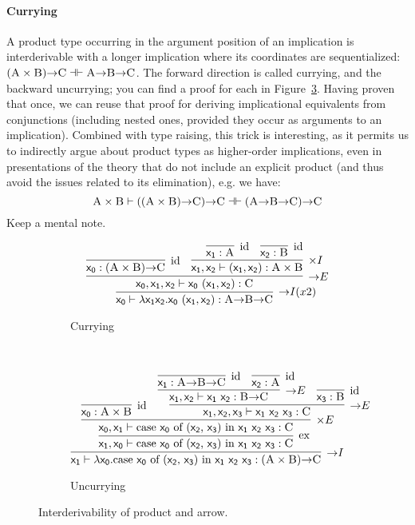 \paragraph{Currying}
A product type occurring in the argument position of an implication is interderivable with a longer implication where its coordinates are sequentialized: $(\smallprop{A}\times\smallprop{B}) \ii \smallprop{C} \dashv \vdash \smallprop{A} \ii \smallprop{B} \ii \smallprop{C}$.
The forward direction is called currying, and the backward uncurrying; you can find a proof for each in Figure~\ref{figure:curry_uncurry}.
Having proven that once, we can reuse that proof for deriving implicational equivalents from conjunctions (including nested ones, provided they occur as arguments to an implication).
Combined with type raising, this trick is interesting, as it permits us to indirectly argue about product types as higher-order implications, even in presentations of the theory that do not include an explicit product (and thus avoid the issues related to its elimination), e.g. we have:
\[
	\prop{A} \times \prop{B} \vdash ((\prop{A} \times \prop{B}) \ii \prop{C}) \ii \prop{C} \dashv \vdash (\prop{A} \ii \prop{B} \ii \prop{C}) \ii \prop{C}
\]
Keep a mental note.

\begin{figure}
	\centering
	\begin{subfigure}{1\textwidth}
		\[
		\infer[\ii I (x2)]{\term{x_0} \vdash \term{\lambda x_1x_2.x_0~(\term{x_1},\term{x_2})}: \prop{A} \ii \prop{B} \ii \prop{C}}{
			\infer[\ii E]{\term{x_0}, \term{x_1}, \term{x_2} \vdash \term{x_0}~(\term{x_1}, \term{x_2}): \prop{C}}{
				\infer[\Ax]{\term{x_0}: (\prop{A} \times \prop{B}) \ii \prop{C}}{}
				&
				\infer[\times I]{ \term{x_1}, \term{x_2} \vdash (\term{x_1},\term{x_2}): \prop{A} \times \prop{B}}{
					\infer[\Ax]{\term{x_1}: \prop{A}}{}
					&			
					\infer[\Ax]{\term{x_2}: \prop{B}}{}
				}
			}
		}
		\]
		\caption{Currying}
		\label{subfigure:currying}
	\end{subfigure}\\[\midsep]
	\begin{subfigure}{1\textwidth}
		\[
			\infer[\ii I]{\term{x_1} \vdash \term{\lambda x_0.}\cterm{case \term{x_0} of (\term{x_2}, \term{x_3}) in \term{x_1~x_2~x_3}}:(\prop{A} \times \prop{B})\ii \prop{C}}{
				\infer[\Exchange{}]{\term{x_1}, \term{x_0}  \vdash \cterm{case \term{x_0} of (\term{x_2}, \term{x_3}) in \term{x_1~x_2~x_3}}:\prop{C}}{
					\infer[\times E]{\term{x_0}, \term{x_1} \vdash \cterm{case \term{x_0} of (\term{x_2}, \term{x_3}) in \term{x_1~x_2~x_3}}:\prop{C}}{
						\infer[\Ax]{\term{x_0}: \prop{A} \times \prop{B}}{}
						&
						\infer[\ii E]{\term{x_1}, \term{x_2}, \term{x_3} \vdash \term{x_1~x_2~x_3}: \prop{C}}{
							\infer[\ii E]{\term{x_1}, \term{x_2} \vdash \term{x_1~x_2}: \prop{B} \ii \prop{C}}{
								\infer[\Ax]{\term{x_1}: \prop{A} \ii \prop{B} \ii \prop{C}}{}
								&
								\infer[\Ax]{\term{x_2}: \prop{A}}{}
							}
							&
							\infer[\Ax]{\term{x_3}: \prop{B}}{}
						}
					}
				}
			}
		\]
		\caption{Uncurrying}
		\label{subfigure:uncurrying}
	\end{subfigure}
	\caption{Interderivability of product and arrow.}
	\label{figure:curry_uncurry}
\end{figure}

